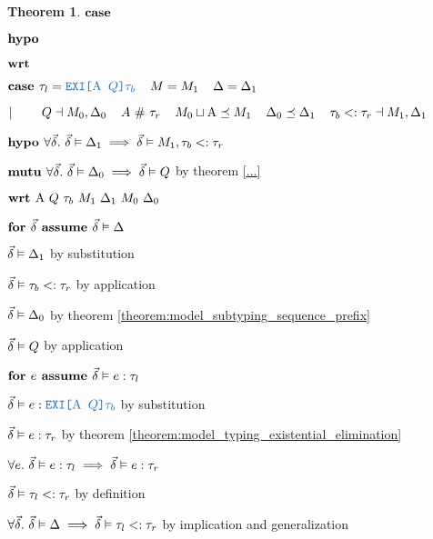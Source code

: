 \documentclass[acmsmall]{acmart}
\theoremstyle{definition}
\newtheorem{theorem}{Theorem}[section]
\begin{document}
\begin{theorem}
    \item \Z $\textbf{case } $
    \item \Z $\textbf{hypo } $
    \item \Z $\textbf{wrt } $
      \item \Z\Z {} 

    \item \Z $\B{case } 
      \tau_l = \obj{EXI[$\Alpha$ $Q$]$\tau_b$}
      \I
      M = M_1
      \I
      \Delta = \Delta_1
    $
    \item \Z $|\ \ \ \ \ \ \ 
      Q \dashv M_0, \Delta_0
      \hspace{4mm}
      A \ \#\  \tau_r
      \hspace{4mm}
      M_0 \sqcup \mathrm{A} \preceq M_1
      \hspace{4mm}
      \Delta_0 \preceq \Delta_1
      \hspace{4mm}
      \tau_b <: \tau_r
      \dashv M_1, \Delta_1
    $
    \item \Z $\textbf{hypo } 
      \forall \vec{\delta} .\ \vec{\delta} \vDash \Delta_1 \implies \vec{\delta} \vDash M_1, \tau_b <: \tau_r 
    $
    \item \Z $\textbf{mutu } 
      \forall \vec{\delta} .\ \vec{\delta} \vDash \Delta_0 \implies \vec{\delta} \vDash Q 
    $ by theorem \ref{...} 
    \item \Z $\B{wrt } \Alpha\ Q\ \tau_b\ M_1\ \Delta_1\ M_0\ \Delta_0$
      \item \Z\Z $\textbf{for } \vec{\delta} \textbf{ assume } \vec{\delta} \vDash \Delta$
        \item \Z\Z\Z $\vec{\delta} \vDash \Delta_1 $ by substitution
        \item \Z\Z\Z $\vec{\delta} \vDash \tau_b <: \tau_r$ by application
        \item \Z\Z\Z $\vec{\delta} \vDash \Delta_0 $ by theorem \ref{theorem:model_subtyping_sequence_prefix}
        \item \Z\Z\Z $\vec{\delta} \vDash Q$ by application
        \item \Z\Z\Z $\textbf{for } e \textbf{ assume } \vec{\delta} \vDash e : \tau_l$ 
          \item \Z\Z\Z\Z $\vec{\delta} \satisfies e \hastype \obj{EXI[$\Alpha$ $Q$]$\tau_b$}$ by substitution
          \item \Z\Z\Z\Z $\vec{\delta} \vDash e : \tau_r$ by theorem \ref{theorem:model_typing_existential_elimination} 
        \item \Z\Z\Z $\forall e .\ \vec{\delta} \vDash e : \tau_l 
          \implies \vec{\delta} \vDash e : \tau_r
        $ 
        \item \Z\Z\Z $\vec{\delta} \vDash \tau_l <: \tau_r$ by definition 
      \item \Z\Z $\forall \vec{\delta} .\ \vec{\delta} \vDash \Delta \implies \vec{\delta} \vDash \tau_l <: \tau_r$ 
      by implication and generalization


\end{theorem}
\end{document}
